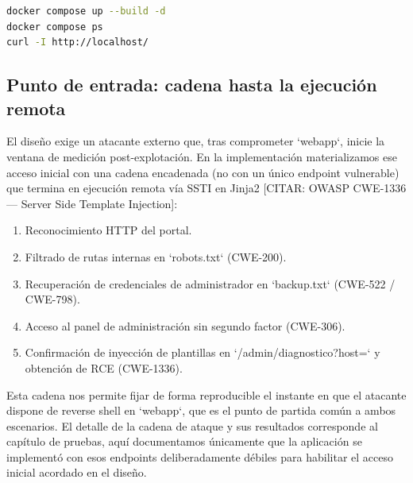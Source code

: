 \documentclass[11pt,spanish,listoffigures,listoftables]{tfgetsinf}
\begin{document}
        \begin{lstlisting}[language=Bash, aboveskip=10pt, belowskip=0pt]
docker compose up --build -d
docker compose ps
curl -I http://localhost/
        \end{lstlisting}
        
        \subsection{Punto de entrada: cadena hasta la ejecución remota}     %
        \label{sec:5.2.2}
        El diseño exige un atacante externo que, tras comprometer `webapp`, inicie la ventana de medición post-explotación. En la implementación materializamos ese acceso inicial con una cadena encadenada (no con un único endpoint vulnerable) que termina en ejecución remota vía SSTI en Jinja2 [CITAR: OWASP CWE-1336 — Server Side Template Injection]:
        \begin{enumerate}
            \item Reconocimiento HTTP del portal.
            \item Filtrado de rutas internas en `robots.txt` (CWE-200).
            \item Recuperación de credenciales de administrador en `backup.txt` (CWE-522 / CWE-798).
            \item Acceso al panel de administración sin segundo factor (CWE-306).
            \item Confirmación de inyección de plantillas en `/admin/diagnostico?host=` y obtención de RCE (CWE-1336).
        \end{enumerate}
        
        Esta cadena nos permite fijar de forma reproducible el instante en que el atacante dispone de reverse shell en `webapp`, que es el punto de partida común a ambos escenarios. El detalle de la cadena de ataque y sus resultados corresponde al capítulo de pruebas, aquí documentamos únicamente que la aplicación se implementó con esos endpoints deliberadamente débiles para habilitar el acceso inicial acordado en el diseño.
        
\end{document}
